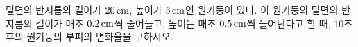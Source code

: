 밑면의 반지름의 길이가 $20\mkern3mu \mathrm{cm}$, 높이가 $5\mkern3mu \mathrm{cm}$인 원기둥이 있다. 이 원기둥의 밑면의 반지름의 길이가 매초 $0.2\mkern3mu \mathrm{cm}$씩 줄어들고, 높이는 매초 $0.5\mkern3mu \mathrm{cm}$씩 늘어난다고 할 때, $10$초 후의 원기둥의 부피의 변화율을 구하시오.
